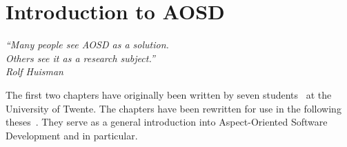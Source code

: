 \chapter{Introduction to AOSD}
\label{chp:AOSD}
\begin{flushright}
\textit{``Many people see AOSD as a solution.}\\
\textit{Others see it as a research subject.''}\\
\textit{Rolf Huisman}\\
\end{flushright}

The first two chapters have originally been written by seven \MSc students~\cite{Holljen2004, Durr2004, Vinkes2004, Bosman2004, Staijen2005, Havinga2005, Boschman2006} at the University of Twente.
The chapters have been rewritten for use in the following theses~\cite{VanOudheusden2006, Conradi2006, TeWinkel2006, Huttenhuis2006, Doornenbal2006, Huisman2006, SpenkelinkD2006}.
They serve as a general introduction into Aspect-Oriented Software Development and \Compose* in particular.



